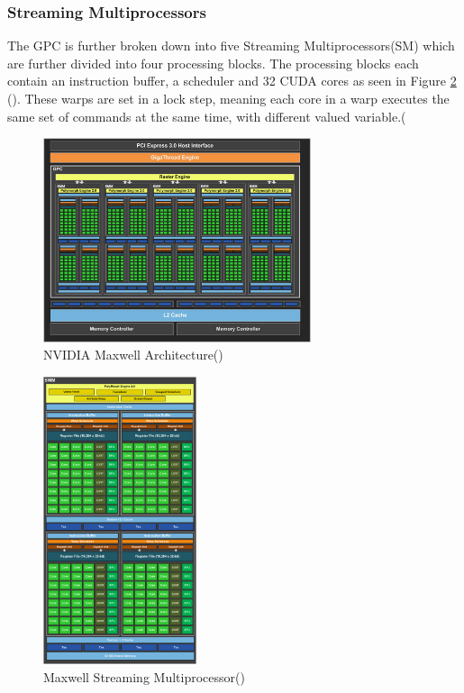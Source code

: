 \subsubsection{Streaming Multiprocessors}\label{gpu:ssec:smm}
The GPC is further broken down into five Streaming Multiprocessors(SM) which are further divided into four processing blocks. The processing blocks each contain an instruction buffer, a scheduler and 32 CUDA cores as seen in Figure \ref{gpu:img:smm} (\cite{GM107SMM}). These warps are set in a lock step, meaning each core in a warp executes the same set of commands at the same time, with different valued variable.(\cite{CUDA_DEVKIT}
%
\begin{figure}[H]
 \centering
 \includegraphics[width=0.7\textwidth]{Images/GM107.jpg}
 \caption{NVIDIA Maxwell Architecture(\cite{GM107})}
 \label{gpu:img:gm107}
\end{figure}
%
\begin{figure}[H]
\centering
 \includegraphics[width=0.4\textwidth]{Images/GM107SMM.png}
 \caption{Maxwell Streaming Multiprocessor(\cite{GM107SMM})}
 \label{gpu:img:smm}
\end{figure}
